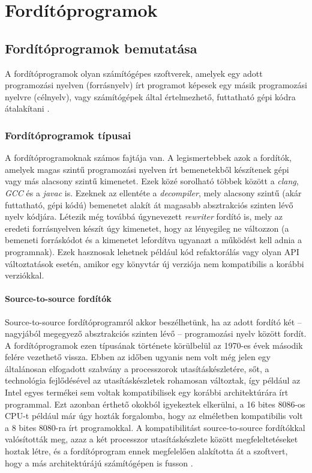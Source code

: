 
\chapter{Fordítóprogramok}

\section{Fordítóprogramok bemutatása} \label{sect:compilerintro}
A fordítóprogramok olyan számítógépes szoftverek, amelyek egy adott programozási nyelven (forrásnyelv) írt programot képesek egy másik programozási nyelvre (célnyelv), vagy számítógépek által értelmezhető, futtatható gépi kódra átalakítani \cite{CompilerWiki} \cite{ForditoWiki}.

\subsection{Fordítóprogramok típusai} \label{sect:compilertypes}
A fordítóprogramoknak számos fajtája van. A legismertebbek azok a fordítók, amelyek magas szintű programozási nyelven írt bemenetekből készítenek gépi vagy más alacsony szintű kimenetet. Ezek közé sorolható többek között a \textit{clang}, \textit{GCC} és a \textit{javac} is. Ezeknek az ellentéte a \textit{decompiler}, mely alacsony szintű (akár futtatható, gépi kódú) bemenetet alakít át magasabb absztrakciós szinten lévő nyelv kódjára. Létezik még továbbá úgynevezett \textit{rewriter} fordító is, mely az eredeti forrásnyelven készít úgy kimenetet, hogy az lényegileg ne változzon (a bemeneti forráskódot és a kimenetet lefordítva ugyanazt a működést kell adnia a programnak). Ezek hasznosak lehetnek például kód refaktorálás vagy olyan API változtatások esetén, amikor egy könyvtár új verziója nem kompatibilis a korábbi verziókkal.

\subsubsection{Source-to-source fordítók}
Source-to-source fordítóprogramról akkor beszélhetünk, ha az adott fordító két -- nagyjából megegyező absztrakciós szinten lévő -- programozási nyelv között fordít. A fordítóprogramok ezen típusának története körülbelül az 1970-es évek második felére vezethető vissza. Ebben az időben ugyanis nem volt még jelen egy általánosan elfogadott szabvány a processzorok utasításkészletére, sőt, a technológia fejlődésével az utasításkészletek rohamosan változtak, így például az Intel egyes termékei sem voltak kompatibilisek egy korábbi architektúrára írt programmal. Ezt azonban érthető okokból igyekeztek elkerülni, a 16 bites 8086-os CPU-t például már úgy hozták forgalomba, hogy az elméletben kompatibilis volt a 8 bites 8080-ra írt programokkal. A kompatibilitást source-to-source fordítókkal valósították meg, azaz a két processzor utasításkészlete között megfeleltetéseket hoztak létre, és a fordítóprogram ennek megfelelően alakította át a szoftvert, hogy a más architektúrájú számítógépen is fusson \cite{StsCompWiki}.

